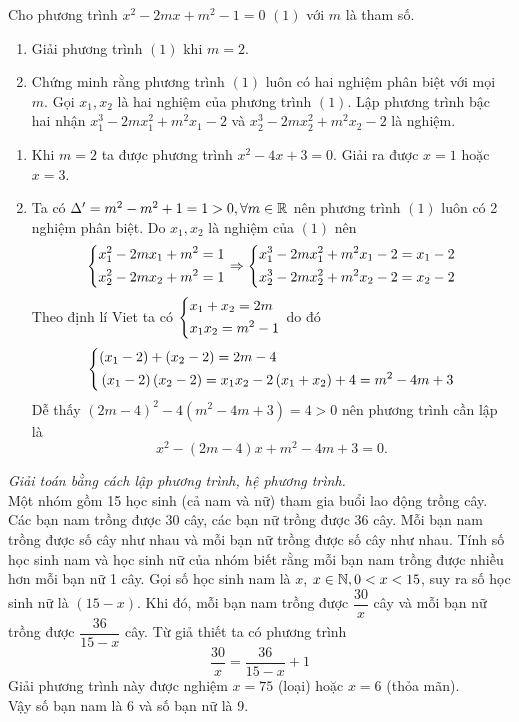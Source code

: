 \begin{ex}%
    Cho phương trình $x^2-2mx +m^2-1=0 \,\,(1)$ với $m$ là tham số.
    \begin{enumerate}
        \item Giải phương trình $(1)$ khi $m=2$.
        \item Chứng minh rằng phương trình $(1)$ luôn có hai nghiệm phân biệt với mọi $m$. Gọi $x_1,x_2$ là hai nghiệm của phương trình $(1)$. Lập phương trình bậc hai nhận $x_1^3-2mx_1^2+m^2x_1-2$ và $x_2^3-2mx_2^2+m^2x_2-2$ là nghiệm.
    \end{enumerate}
\loigiai
    {
    \begin{enumerate}
        \item Khi $m=2$ ta được phương trình $x^2-4x+3=0$. Giải ra được $x=1$ hoặc $x=3$.
        \item Ta có $\Delta'=m^2-m^2+1=1>0, \forall m \in \Bbb R$ nên phương trình $(1)$ luôn có 2 nghiệm phân biệt. Do $x_1,x_2$ là nghiệm của $(1)$ nên 
        	$$\left\{\begin{aligned}& x^2_1-2mx_1+m^2=1\\& x^2_2-2mx_2+m^2=1\end{aligned}\right. \Rightarrow \left\{\begin{aligned}& x^3_1-2mx^2_1+m^2x_1-2=x_1-2\\& x^3_2-2mx^2_2+m^2x_2-2=x_2-2\end{aligned}\right.$$
        Theo định lí Viet ta có $\left\{\begin{aligned}& x_1+x_2=2m\\& x_1x_2=m^2-1\end{aligned}\right.$
        do đó
        	$$\left\{\begin{aligned}&(x_1-2)+(x_2-2)=2m-4\\&\left( x_1-2\right)\left( x_2-2\right)=x_1x_2-2\left( x_1+x_2\right)+4=m^2-4m+3\end{aligned}\right.$$
        Dễ thấy $(2m-4)^2-4(m^2-4m+3)=4>0$ nên phương trình cần lập là 
        $$x^2-(2m-4)x+m^2-4m+3=0.$$
    \end{enumerate}
    }
\end{ex}

\begin{ex}%
    \textit{Giải toán bằng cách lập phương trình, hệ phương trình.}\\
	Một nhóm gồm 15 học sinh (cả nam và nữ) tham gia buổi lao động trồng cây. Các bạn nam trồng được 30 cây, các bạn nữ trồng được 36 cây. Mỗi bạn nam trồng được số cây như nhau và mỗi bạn nữ trồng được số cây như nhau. Tính số học sinh nam và học sinh nữ của nhóm biết rằng mỗi bạn nam trồng được nhiều hơn mỗi bạn nữ 1 cây.
\loigiai
    {
  Gọi số học sinh nam là $x$, $x\in \Bbb N,0<x<15$, suy ra số học sinh nữ là $(15-x)$. Khi đó, mỗi bạn nam trồng được $\dfrac{30}{x}$ cây và mỗi bạn nữ trồng được $\dfrac{36}{15-x}$ cây. Từ giả thiết ta có phương trình
  $$\dfrac{30}{x}=\dfrac{36}{15-x}+1$$
  Giải phương trình này được nghiệm $x=75$ (loại) hoặc $x=6$ (thỏa mãn).\\
  Vậy số bạn nam là 6 và số bạn nữ là 9.
    }
\end{ex}

